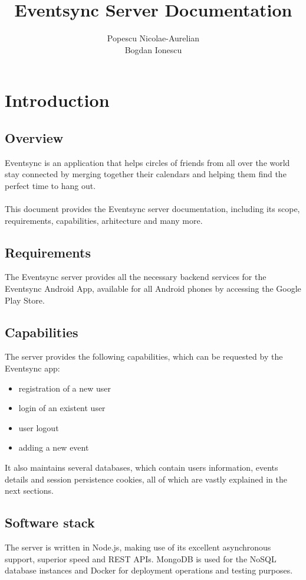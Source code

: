 \documentclass{article}
\title{Eventsync Server Documentation}
\author{Popescu Nicolae-Aurelian \\ Bogdan Ionescu}
\begin{document}
\begin{titlepage}
\maketitle
\end{titlepage}

\tableofcontents
\pagebreak

\section{Introduction}
\subsection{Overview}
Eventsync is an application that helps circles of friends from all over the world stay connected by merging together their calendars and helping them find the perfect time to hang out. \\ \\
\noindent
This document provides the Eventsync server documentation, including its scope, requirements, capabilities, arhitecture and many more.

\subsection{Requirements}
The Eventsync server provides all the necessary backend services for the Eventsync Android App, available for all Android phones by accessing the Google Play Store.

\subsection{Capabilities}
The server provides the following capabilities, which can be requested by the Eventsync app:
\begin{itemize}
\item registration of a new user
\item login of an existent user
\item user logout
\item adding a new event
\end{itemize}
It also maintains several databases, which contain users information, events details and session persistence cookies, all of which are vastly explained in the next sections.

\subsection{Software stack}
The server is written in Node.js, making use of its excellent asynchronous support, superior speed and REST APIs. MongoDB is used for the NoSQL database instances and Docker for deployment operations and testing purposes.
\end{document}
